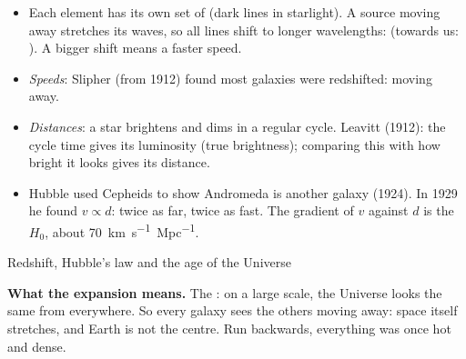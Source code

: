 \begin{itemize}
  \item Each element has its own set of  (dark lines in starlight). A source moving away stretches
        its waves, so all lines shift to longer wavelengths:  (towards us:
        ). A bigger shift means a faster speed.
  \item \emph{Speeds}: Slipher (from 1912) found most galaxies were redshifted: moving away.
  \item \emph{Distances}: a  star brightens and dims in a regular cycle.
        Leavitt (1912): the cycle time gives its luminosity (true brightness); comparing this
        with how bright it looks gives its distance.
  \item Hubble used Cepheids to show Andromeda is another galaxy (1924). In 1929 he found
        $v \propto d$: twice as far, twice as fast. The gradient of $v$ against $d$ is the
         $H_0$, about \qty{70}{km.s^{-1}.Mpc^{-1}}.
\end{itemize}

\begin{formulacard}{Redshift, Hubble's law and the age of the Universe}
  \begin{symbols}
  \end{symbols}
\end{formulacard}

\textbf{What the expansion means.} The : on a large scale, the
Universe looks the same from everywhere. So every galaxy sees the others moving away: space
itself stretches, and Earth is not the centre. Run backwards, everything was once hot and dense.

